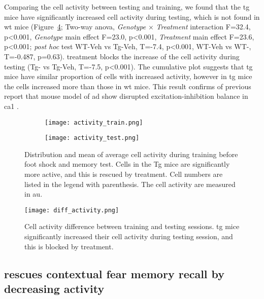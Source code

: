 Comparing the cell activity between testing and training, we found that the \gls{tg} mice have significantly increased cell activity during testing,  which is not found in \gls{wt} mice (Figure~\ref{f.ad.actdiff}; Two-way \gls{anova}, \textit{Genotype} $\times$ \textit{Treatment} interaction F=32.4, p<0.001, \textit{Genotype} main effect F=23.0, p<0.001, \textit{Treatment} main effect F=23.6, p<0.001; \textit{post hoc} test WT-Veh vs Tg-Veh, T=-7.4, p<0.001, WT-Veh vs WT-\glu, T=-0.487, p=0.63). \tglu{} treatment blocks the increase of the cell activity during testing (Tg-\glu{} vs Tg-Veh, T=-7.5, p<0.001). The cumulative plot suggests that \gls{tg} mice have similar proportion of cells with increased activity, however in \gls{tg} mice the cells increased more than those in \gls{wt} mice. This result confirms of previous report that mouse model of \gls{ad} show disrupted excitation-inhibition balance in \gls{ca1} \citep{palop16}.

\begin{figure}[h]
    \begin{subfigure}[h]{\textwidth}
        \texttt{[image: activity\_train.png]}
        \caption{\label{f.ad.acttrain}}
    \end{subfigure}
    \begin{subfigure}[h]{\textwidth}
        \texttt{[image: activity\_test.png]}
        \caption{\label{f.ad.acttest}}
    \end{subfigure}
    \caption[Cell activity during training and memory test.]{Distribution and mean of average cell activity during  training before foot shock and  memory test. Cells in the Tg mice are significantly more active, and this is rescued by \tglu{} treatment. Cell numbers are listed in the legend with parenthesis. The cell activity are measured in \gls{au}. \label{f.ad.activity}}
\end{figure}

\begin{figure}[h]
    \texttt{[image: diff\_activity.png]}
    \caption[Cell activity difference between training and memory test.]{Cell activity difference between training and testing sessions. \gls{tg} mice significantly increased their cell activity during testing session, and this is blocked by \tglu{} treatment. \label{f.ad.actdiff}}
\end{figure}


\subsection{\tglu{} rescues contextual fear memory recall by decreasing activity}

